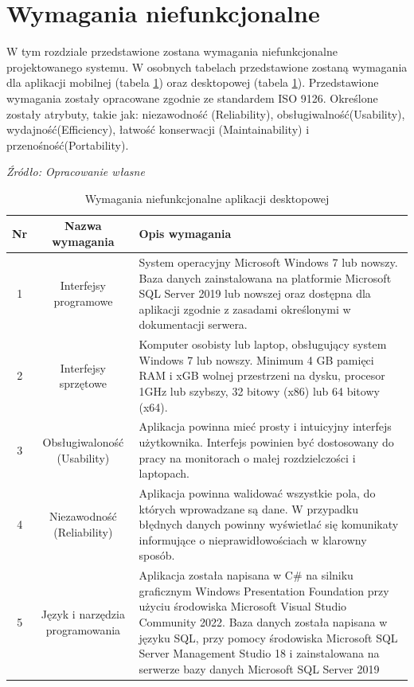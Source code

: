 \documentclass[12pt,twoside]{report}
\begin{document}
\section{Wymagania niefunkcjonalne}
W tym rozdziale przedstawione zostana wymagania niefunkcjonalne projektowanego systemu. W osobnych tabelach przedstawione zostaną wymagania dla aplikacji mobilnej (tabela \ref{}) oraz desktopowej (tabela \ref{WymaganiaNFdesktop}). 
Przedstawione wymagania zostały opracowane zgodnie ze standardem ISO 9126. Określone zostały atrybuty, takie jak: niezawodność (Reliability), obsługiwalność(Usability), wydajność(Efficiency), łatwość konserwacji (Maintainability) i przenośność(Portability).
	\begin{table}[H]
	\caption{Wymagania niefunkcjonalne aplikacji desktopowej }
	\textit{Źródło: Opracowanie własne}
	\label{WymaganiaNFdesktop}
	\centering
	\begin{tabular}{|c|c|p{8cm}|}
		\hline
		Nr & Nazwa wymagania & Opis wymagania\\
		\hline
		1& Interfejsy programowe& System operacyjny Microsoft Windows 7 lub nowszy. Baza danych zainstalowana na platformie Microsoft SQL Server 2019 lub nowszej oraz dostępna dla aplikacji zgodnie z zasadami określonymi w dokumentacji serwera.\\		
		\hline
		2& Interfejsy sprzętowe& Komputer osobisty lub laptop, obsługujący system Windows 7 lub nowszy. Minimum 4 GB pamięci RAM i xGB wolnej przestrzeni na dysku, procesor 1GHz lub szybszy, 32 bitowy (x86) lub 64 bitowy (x64).\\	
		\hline	
		3& Obsługiwaloność (Usability)& Aplikacja powinna mieć prosty i intuicyjny interfejs użytkownika. Interfejs powinien być dostosowany do pracy na monitorach o małej rozdzielczości i laptopach.\\		
		\hline
		4& Niezawodność (Reliability)& Aplikacja powinna walidować wszystkie pola, do których wprowadzane są dane. W przypadku błędnych danych powinny wyświetlać się komunikaty informujące o nieprawidłowościach w klarowny sposób.\\	
		\hline
		5& Język i narzędzia programowania& Aplikacja została napisana w C\# na silniku graficznym Windows Presentation Foundation przy użyciu środowiska  Microsoft Visual Studio Community 2022.
		Baza danych została napisana w języku SQL, przy pomocy środowiska Microsoft SQL Server Management Studio 18 i zainstalowana na serwerze bazy danych Microsoft SQL Server 2019\\	
		\hline
	\end{tabular}
\end{table}
\end{document}
